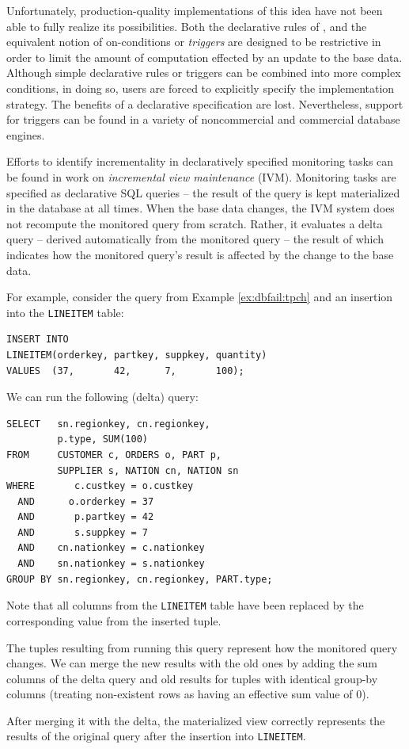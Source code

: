 Unfortunately, production-quality implementations of this idea have not been able to fully realize its possibilities.  Both the declarative rules of \cite{morgenstern1983active}, and the equivalent notion of on-conditions\cite{taylor1976codasyl} or {\em triggers}\cite{mccarthy1989architecture} are designed to be restrictive in order to limit the amount of computation effected by an update to the base data.  Although simple declarative rules or triggers can be combined into more complex conditions\cite{DBLP:conf/icde/ZimmerU99}, in doing so, users are forced to explicitly specify the implementation strategy.  The benefits of a declarative specification are lost.  Nevertheless, support for triggers can be found in a variety of noncommercial\cite{stonebraker1991postgres,mysql1mysql} and commercial\cite{oracle,graymicrosoft,gassner1993query} database engines.

Efforts to identify incrementality in declaratively specified monitoring tasks can be found in work on {\em incremental view maintenance} (IVM)\cite{gupta1993maintaining,ceri1991deriving}.  Monitoring tasks are specified as declarative SQL queries -- the result of the query is kept materialized in the database at all times.  When the base data changes, the IVM system does not recompute the monitored query from scratch.  Rather, it evaluates a delta query -- derived automatically from the monitored query -- the result of which indicates how the monitored query's result is affected by the change to the base data.

\begin{example}
For example, consider the query from Example \ref{ex:dbfail:tpch} and an insertion into the {\tt LINEITEM} table:
\begin{verbatim}
INSERT INTO 
LINEITEM(orderkey, partkey, suppkey, quantity)
VALUES  (37,       42,      7,       100);
\end{verbatim}

We can run the following (delta) query:
\begin{verbatim}
SELECT   sn.regionkey, cn.regionkey,
         p.type, SUM(100) 
FROM     CUSTOMER c, ORDERS o, PART p, 
         SUPPLIER s, NATION cn, NATION sn
WHERE       c.custkey = o.custkey
  AND      o.orderkey = 37
  AND       p.partkey = 42
  AND       s.suppkey = 7
  AND    cn.nationkey = c.nationkey
  AND    sn.nationkey = s.nationkey
GROUP BY sn.regionkey, cn.regionkey, PART.type;
\end{verbatim}

Note that all columns from the {\tt LINEITEM} table have been replaced by the corresponding value from the inserted tuple.  

The tuples resulting from running this query represent how the monitored query changes.  We can merge the new results with the old ones by adding the sum columns of the delta query and old results for tuples with identical group-by columns (treating non-existent rows as having an effective sum value of 0).

After merging it with the delta, the materialized view correctly represents the results of the original query after the insertion into {\tt LINEITEM}.
\end{example}

